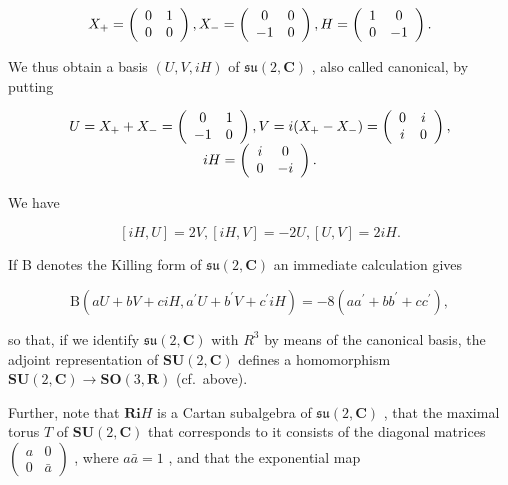 \[
X _ {+} = \left( \begin{array}{c c} 0 & 1 \\ 0 & 0 \end{array} \right), X _ {-} = \left( \begin{array}{c c} 0 & 0 \\ - 1 & 0 \end{array} \right), H = \left( \begin{array}{c c} 1 & 0 \\ 0 & - 1 \end{array} \right).
\]

We thus obtain a basis \((U, V, iH)\) of \(\mathfrak{su}(2, \mathbf{C})\) , also called canonical, by putting

\[
\begin{array}{c} U = X _ {+} + X _ {-} = \left( \begin{array}{c c} 0 & 1 \\ - 1 & 0 \end{array} \right), V = i (X _ {+} - X _ {-}) = \left( \begin{array}{c c} 0 & i \\ i & 0 \end{array} \right), \\ i H = \left( \begin{array}{c c} i & 0 \\ 0 & - i \end{array} \right). \end{array}
\]

We have

\[
[ i H, U ] = 2 V, [ i H, V ] = - 2 U, [ U, V ] = 2 i H.\tag{13}
\]

If B denotes the Killing form of \(\mathfrak{su}(2,\mathbf{C})\) an immediate calculation gives

\[
\mathrm{B} (a U + b V + c i H, a ^ {\prime} U + b ^ {\prime} V + c ^ {\prime} i H) = - 8 (a a ^ {\prime} + b b ^ {\prime} + c c ^ {\prime}),\tag{14}
\]

so that, if we identify \(\mathfrak{su}(2,\mathbf{C})\) with \(R^{3}\) by means of the canonical basis, the adjoint representation of \(\mathbf{SU}(2,\mathbf{C})\) defines a homomorphism \(\mathbf{SU}(2,\mathbf{C})\to\mathbf{SO}(3,\mathbf{R})\) (cf.~above).

Further, note that \(\mathbf{Ri}H\) is a Cartan subalgebra of \(\mathfrak{su}(2,\mathbf{C})\) , that the maximal torus \(T\) of \(\mathbf{SU}(2,\mathbf{C})\) that corresponds to it consists of the diagonal matrices \(\left( \begin{array}{cc}a & 0\\ 0 & \bar{a} \end{array} \right)\) , where \(a\bar{a} = 1\) , and that the exponential map

